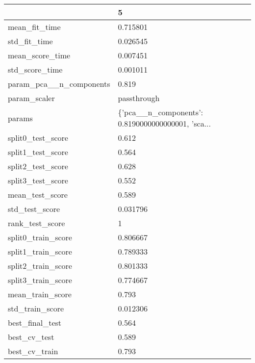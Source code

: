 \begin{tabular}{ll}
\toprule
{} &                                                  5 \\
\midrule
mean\_fit\_time           &                                           0.715801 \\
std\_fit\_time            &                                           0.026545 \\
mean\_score\_time         &                                           0.007451 \\
std\_score\_time          &                                           0.001011 \\
param\_pca\_\_n\_components &                                              0.819 \\
param\_scaler            &                                        passthrough \\
params                  &  \{'pca\_\_n\_components': 0.8190000000000001, 'sca... \\
split0\_test\_score       &                                              0.612 \\
split1\_test\_score       &                                              0.564 \\
split2\_test\_score       &                                              0.628 \\
split3\_test\_score       &                                              0.552 \\
mean\_test\_score         &                                              0.589 \\
std\_test\_score          &                                           0.031796 \\
rank\_test\_score         &                                                  1 \\
split0\_train\_score      &                                           0.806667 \\
split1\_train\_score      &                                           0.789333 \\
split2\_train\_score      &                                           0.801333 \\
split3\_train\_score      &                                           0.774667 \\
mean\_train\_score        &                                              0.793 \\
std\_train\_score         &                                           0.012306 \\
best\_final\_test         &                                              0.564 \\
best\_cv\_test            &                                              0.589 \\
best\_cv\_train           &                                              0.793 \\
\bottomrule
\end{tabular}
